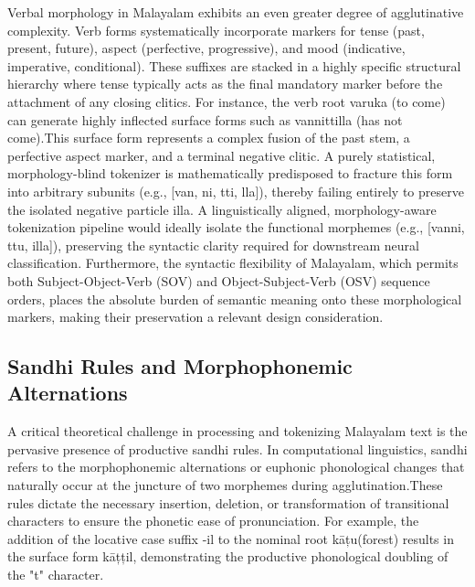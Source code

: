 \documentclass[12pt]{article}
\begin{document}
Verbal morphology in Malayalam exhibits an even greater degree of agglutinative complexity. Verb forms systematically incorporate markers for tense (past, present, future), aspect (perfective, progressive), and mood (indicative, imperative, conditional). These suffixes are stacked in a highly specific structural hierarchy where tense typically acts as the final mandatory marker before the attachment of any closing clitics. For instance, the verb root varuka (to come) can generate highly inflected surface forms such as vannittilla (has not come).This surface form represents a complex fusion of the past stem, a perfective aspect marker, and a terminal negative clitic. A purely statistical, morphology-blind tokenizer is mathematically predisposed to fracture this form into arbitrary subunits (e.g., [van, ni, tti, lla]), thereby failing entirely to preserve the isolated negative particle illa. A linguistically aligned, morphology-aware tokenization pipeline would ideally isolate the functional morphemes (e.g., [vanni, ttu, illa]), preserving the syntactic clarity required for downstream neural classification. Furthermore, the syntactic flexibility of Malayalam, which permits both Subject-Object-Verb (SOV) and Object-Subject-Verb (OSV) sequence orders, places the absolute burden of semantic meaning onto these morphological markers, making their preservation a relevant design consideration. 

\subsection{Sandhi Rules and Morphophonemic Alternations }

A critical theoretical challenge in processing and tokenizing Malayalam text is the pervasive presence of productive sandhi rules. In computational linguistics, sandhi refers to the morphophonemic alternations or euphonic phonological changes that naturally occur at the juncture of two morphemes during agglutination.These rules dictate the necessary insertion, deletion, or transformation of transitional characters to ensure the phonetic ease of pronunciation. For example, the addition of the locative case suffix -il to the nominal root kāțu(forest) results in the surface form kāțțil, demonstrating the productive phonological doubling of the "t" character. 
\end{document}
